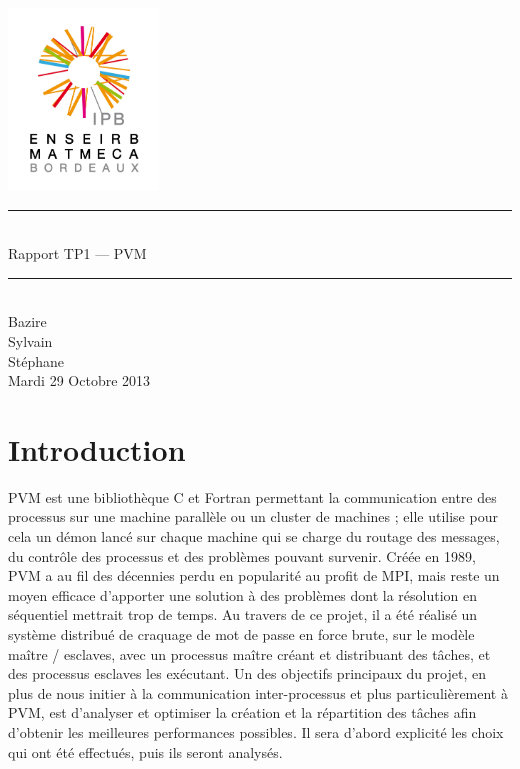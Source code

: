 \documentclass[a4paper,11pt]{article}
\begin{document}
\begin{titlepage}
  \begin{center}

    \begin{center}
      \includegraphics[width=4cm]{EM.jpg}
    \end{center}

    \vspace*{1cm}
        
    \rule{0.75\linewidth}{0.7mm}\\[0.4cm]
    {\Huge Rapport TP1 --- PVM\\[0.4cm]}
    \rule{0.75\linewidth}{0.7mm} \\[1.5cm]

    {\Large Bazire \\Sylvain {}\\Stéphane \\[2cm]}
    {\Large Mardi 29 Octobre 2013}
  \end{center}
\end{titlepage}

\tableofcontents
\clearpage
\section{Introduction}

PVM est une bibliothèque C et Fortran permettant la communication entre des processus sur une machine parallèle ou un cluster de machines ; elle utilise pour cela un démon lancé sur chaque machine qui se charge du routage des messages, du contrôle des processus et des problèmes pouvant survenir. Créée en 1989, PVM a au fil des décennies perdu en popularité au profit de MPI, mais reste un moyen efficace d'apporter une solution à des problèmes dont la résolution en séquentiel mettrait trop de temps. Au travers de ce projet, il a été réalisé un système distribué de craquage de mot de passe en force brute, sur le modèle maître / esclaves, avec un processus maître créant et distribuant des tâches, et des processus esclaves les exécutant. Un des objectifs principaux du projet, en plus de nous initier à la communication inter-processus et plus particulièrement à PVM, est d'analyser et optimiser la création et la répartition des tâches afin d'obtenir les meilleures performances possibles. Il sera d'abord explicité les choix qui ont été effectués, puis ils seront analysés.
\end{document}
